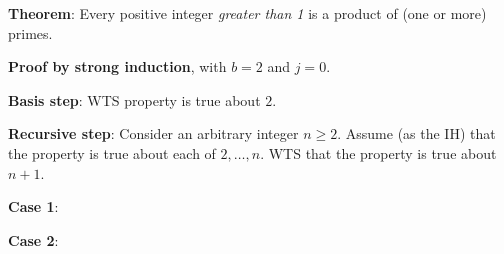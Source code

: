 
{\bf Theorem}: Every positive integer {\it greater than 1} is a product of (one or more) primes.

{\bf Proof by strong induction}, with $b=2$ and $j=0$.

{\bf Basis step}:  WTS property is true about  $2$.
\vspace{20pt}

{\bf Recursive step}: Consider an arbitrary integer $n \geq 2$.
Assume (as the IH) that the property is true about  each of $2, \ldots, n$.  
WTS that the property is true about  $n+1$.


{\bf Case 1}: 


{\bf Case 2}: 

\vfill